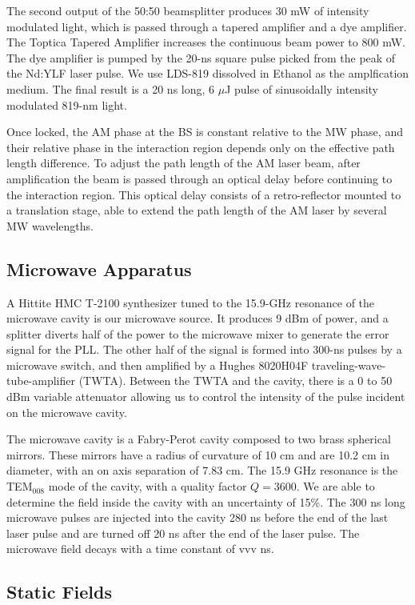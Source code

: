 \documentclass[aps,pra,preprint,groupedaddress]{revtex4-1}
\begin{document}
The second output of the 50:50 beamsplitter produces 30 mW of intensity modulated light, which is passed through a tapered amplifier and a dye amplifier. The Toptica Tapered Amplifier increases the continuous beam power to 800 mW. The dye amplifier is pumped by the 20-ns square pulse picked from the peak of the Nd:YLF laser pulse. We use LDS-819 dissolved in Ethanol as the amplfication medium. The final result is a 20 ns long, 6 $\mu$J pulse of sinusoidally intensity modulated 819-nm light.

Once locked, the AM phase at the BS is constant relative to the MW phase, and their relative phase in the interaction region depends only on the effective path length difference. To adjust the path length of the AM laser beam, after amplification the beam is passed through an optical delay before continuing to the interaction region. This optical delay consists of a retro-reflector mounted to a translation stage, able to extend the path length of the AM laser by several MW wavelengths.

\subsection{\label{cavity} Microwave Apparatus}

A Hittite HMC T-2100 synthesizer tuned to the 15.9-GHz resonance of the microwave cavity is our microwave source. It produces 9 dBm of power, and a splitter diverts half of the power to the microwave mixer to generate the error signal for the PLL. The other half of the signal is formed into 300-ns pulses by a microwave switch, and then amplified by a Hughes 8020H04F traveling-wave-tube-amplifier (TWTA). Between the TWTA and the cavity, there is a 0 to 50 dBm variable attenuator allowing us to control the intensity of the pulse incident on the microwave cavity.

The microwave cavity is a Fabry-Perot cavity composed to two brass spherical mirrors. These mirrors have a radius of curvature of 10 cm and are 10.2 cm in diameter, with an on axis separation of 7.83 cm. The 15.9 GHz resonance is the TEM$_{008}$ mode of the cavity, with a quality factor $Q=3600$. We are able to determine the field inside the cavity with an uncertainty of 15\%. The 300 ns long microwave pulses are injected into the cavity 280 ns before the end of the last laser pulse and are turned off 20 ns after the end of the laser pulse. The microwave field decays with a time constant of vvv ns.

\subsection{\label{fields} Static Fields}
\end{document}
